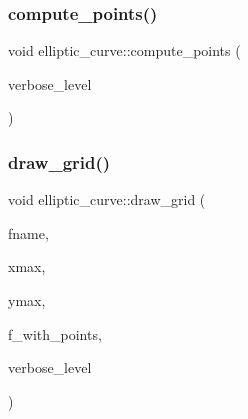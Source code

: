 \mbox{\label{classelliptic__curve_a07f848c282b8e731d9e99e9b358d5a9a}} 
\subsubsection{\texorpdfstring{compute\+\_\+points()}{compute\_points()}}
{\footnotesize\ttfamily void elliptic\+\_\+curve\+::compute\+\_\+points (\begin{DoxyParamCaption}\item[{\mbox{\hyperlink{galois_8h_a09fddde158a3a20bd2dcadb609de11dc}{I\+NT}}}]{verbose\+\_\+level }\end{DoxyParamCaption})}

\mbox{\label{classelliptic__curve_afa9d40e1a626257ad802bdb5a157ad0a}} 
\subsubsection{\texorpdfstring{draw\+\_\+grid()}{draw\_grid()}}
{\footnotesize\ttfamily void elliptic\+\_\+curve\+::draw\+\_\+grid (\begin{DoxyParamCaption}\item[{char $\ast$}]{fname,  }\item[{\mbox{\hyperlink{galois_8h_a09fddde158a3a20bd2dcadb609de11dc}{I\+NT}}}]{xmax,  }\item[{\mbox{\hyperlink{galois_8h_a09fddde158a3a20bd2dcadb609de11dc}{I\+NT}}}]{ymax,  }\item[{\mbox{\hyperlink{galois_8h_a09fddde158a3a20bd2dcadb609de11dc}{I\+NT}}}]{f\+\_\+with\+\_\+points,  }\item[{\mbox{\hyperlink{galois_8h_a09fddde158a3a20bd2dcadb609de11dc}{I\+NT}}}]{verbose\+\_\+level }\end{DoxyParamCaption})}

\mbox{\label{classelliptic__curve_a20f858541aed9bfaabdf69b10f18cdbe}} 
